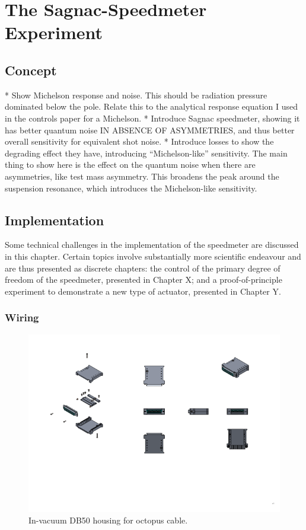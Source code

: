 \chapter{The Sagnac-Speedmeter Experiment}
\label{c:speedmeter-intro}

\section{Concept}
* Show Michelson response and noise. This should be radiation pressure dominated below the pole. Relate this to the analytical response equation I used in the controls paper for a Michelson.
* Introduce Sagnac speedmeter, showing it has better quantum noise IN ABSENCE OF ASYMMETRIES, and thus better overall sensitivity for equivalent shot noise.
* Introduce losses to show the degrading effect they have, introducing ``Michelson-like'' sensitivity. The main thing to show here is the effect on the quantum noise when there are asymmetries, like test mass asymmetry. This broadens the peak around the suspension resonance, which introduces the Michelson-like sensitivity.

\section{Implementation}

Some technical challenges in the implementation of the speedmeter are discussed in this chapter. Certain topics involve substantially more scientific endeavour and are thus presented as discrete chapters: the control of the primary degree of freedom of the speedmeter, presented in Chapter X; and a proof-of-principle experiment to demonstrate a new type of actuator, presented in Chapter Y.

\subsection{Wiring}


\begin{figure}
  \centering
  \includegraphics[width=0.75\columnwidth]{graphics/50-db50-housing.png}
  \caption{In-vacuum DB50 housing for octopus cable.}
  \label{fig:db50-housing}
\end{figure}
